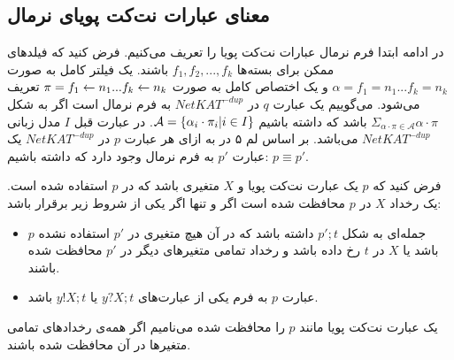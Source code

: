 \subsection{معنای عبارات نت‌کت پویای نرمال}
در ادامه ابتدا فرم نرمال عبارات نت‌کت پویا را تعریف می‌کنیم.
فرض کنید که فیلد‌های ممکن برای بسته‌ها
$f_1,f_2,...,f_k$
باشند.
یک فیلتر کامل%
به صورت
$\alpha = f_1 = n_1 ... f_k = n_k$
و یک اختصاص کامل%
به صورت
$\pi = f_1 \leftarrow n_1 ... f_k \leftarrow n_k$
تعریف می‌شود.
می‌گوییم یک عبارت
$q$
در
$NetKAT^{-dup}$
به فرم نرمال است
اگر به شکل
$\Sigma_{\alpha\cdot\pi \in \mathcal{A}}\alpha\cdot\pi$
باشد که داشته باشیم
$\mathcal{A} = \{\alpha_i\cdot\pi_i | i \in I\}$.
در عبارت قبل
$I$
مدل زبانی
$NetKAT^{-dup}$
می‌باشد.
بر اساس لم ۵ در
\cite{dynetkat}
به ازای هر عبارت
$p$
در
$NetKAT^{-dup}$
یک عبارت
$p'$
به فرم نرمال وجود دارد که داشته باشیم:
$p\equiv p'$.

\begin{definition}
    فرض کنید که
    $p$
    یک عبارت نت‌کت پویا و
    $X$
    متغیری باشد که در
    $p$
    استفاده شده است.
    یک رخداد
    $X$
    در
    $p$
    محافظت شده %
    است اگر و تنها اگر یکی از شروط زیر برقرار باشد:
    \begin{itemize}
        \item $p$
              جمله‌ای به شکل
              $p';t$
              داشته باشد که در آن
              هیچ متغیری در
              $p'$
              استفاده نشده باشد یا
              $X$
              در
              $t$
              رخ داده باشد و رخداد تمامی متغیر‌های دیگر در
              $p'$
              محافظت شده باشند.
        \item عبارت
              $p$
              به فرم یکی از عبارت‌های
              $y?X;t$
              یا
              $y!X;t$
              باشد.
    \end{itemize}
\end{definition}

\begin{definition}
    یک عبارت نت‌کت پویا مانند
    $p$
    را محافظت‌ شده
    می‌نامیم اگر همه‌ی رخداد‌های تمامی متغیر‌ها در آن محافظت شده باشند.
\end{definition}

